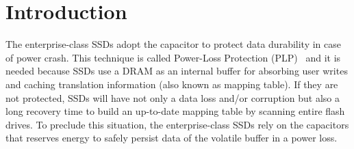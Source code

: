 \section{Introduction}


The enterprise-class SSDs adopt the capacitor to protect data durability in case of power crash. 
This technique is called Power-Loss Protection (PLP)~\cite{micron2014, intel2014, samsungplp2016} and it is needed because SSDs use a DRAM as an internal buffer for absorbing user writes and caching translation information (also known as mapping table). 
If they are not protected, SSDs will have not only a data loss and/or corruption but also a long recovery time to build an up-to-date  mapping table by scanning entire flash drives.
To preclude this situation, the enterprise-class SSDs rely on the capacitors that reserves energy to safely persist data of the volatile buffer in a power loss.


